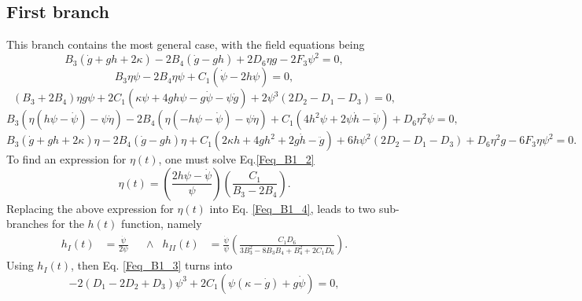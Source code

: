 \subsection{First branch}
\label{sec:first_branch}

This branch contains the most general case, with the field equations being
\begin{dmath}
    \label{Feq_B1_1}
    B_3\left(\dot{g} + gh + 2\kappa\right) - 2B_4\left(\dot{g} - gh\right) + 2D_6\eta g - 2F_3\psi^2 = 0,
\end{dmath}
\begin{dmath}
    \label{Feq_B1_2}
    B_3\eta\psi -2B_4\eta\psi + C_1\left(\dot{\psi} - 2h\psi\right) = 0,
\end{dmath}
\begin{dmath}
    \label{Feq_B1_3}
    \left(B_3 + 2B_4\right)\eta g\psi + 2C_1\left(\kappa\psi + 4gh\psi - g\dot{\psi} - \psi\dot{g}\right) + 2\psi^3\left(2D_2 - D_1 - D_3\right) = 0,
\end{dmath}
\begin{dmath}
    \label{Feq_B1_4}
    B_3\left(\eta\left(h\psi - \dot{\psi}\right) -\psi\dot{\eta}\right) - 2B_4\left(\eta\left(-h\psi - \dot{\psi}\right) -\psi\dot{\eta}\right) 
    + C_1\left(4h^2\psi + 2\psi\dot{h} -\ddot{\psi}\right) + D_6\eta^2\psi = 0,
\end{dmath}
\begin{dmath}
    \label{Feq_B1_5}
    B_3\left(\dot{g} + gh + 2\kappa\right)\eta - 2B_4\left(\dot{g} - gh\right)\eta + C_1\left(2\kappa h + 4gh^2 + 2g\dot{h} - \ddot{g}\right) +
    6h\psi^2\left(2D_2 - D_1 - D_3\right) + D_6 \eta^2 g - 6F_3\eta\psi^2 = 0.
\end{dmath}
To find an expression for $\eta(t)$, one must solve Eq.\eqref{Feq_B1_2} 
\begin{equation}
    \label{B1_eta}
    \eta(t) = \left(\frac{2h\psi - \dot{\psi}}{\psi}\right)\left(\frac{C_1}{B_3 - 2B_4}\right).
\end{equation}
Replacing the above expression for $\eta(t)$ into Eq. \eqref{Feq_B1_4}, leads to two sub-branches for the $h(t)$ function, namely
\begin{align}
    \label{B1_h}
    h_I(t) & = \frac{\dot{\psi}}{2\psi} & & \wedge &  h_{II}(t) & = \frac{\dot{\psi}}{\psi}\left(\frac{C_1 D_6}{3B_3^2 - 8B_3B_4 + B_4^2 + 2C_1D_6}\right).
\end{align}
Using $h_I(t)$, then Eq. \eqref{Feq_B1_3} turns into
\begin{equation}
    -2\left(D_1 - 2D_2 + D_3\right)\psi^3 + 2C_1\left(\psi\left(\kappa - \dot{g}\right) + g\dot{\psi}\right) = 0,
\end{equation}
